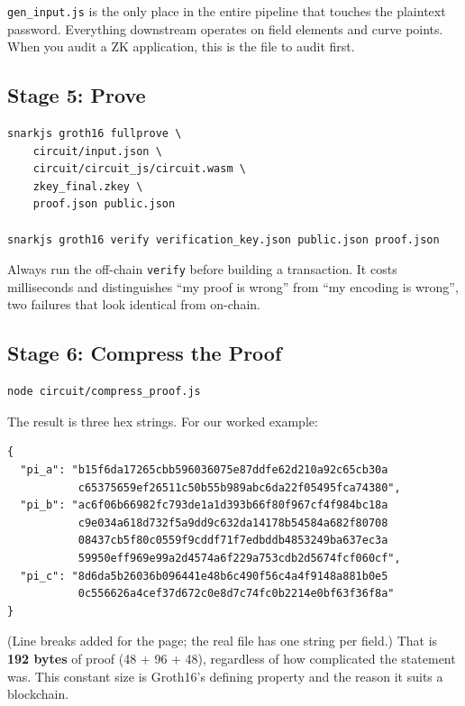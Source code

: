 \begin{remark}
\texttt{gen\_input.js} is the only place in the entire pipeline that touches the
plaintext password. Everything downstream operates on field elements and curve
points. When you audit a ZK application, this is the file to audit first.
\end{remark}

\subsection*{Stage 5: Prove}

\begin{verbatim}
snarkjs groth16 fullprove \
    circuit/input.json \
    circuit/circuit_js/circuit.wasm \
    zkey_final.zkey \
    proof.json public.json

snarkjs groth16 verify verification_key.json public.json proof.json
\end{verbatim}

Always run the off-chain \texttt{verify} before building a transaction. It costs
milliseconds and distinguishes ``my proof is wrong'' from ``my encoding is
wrong'', two failures that look identical from on-chain.

\subsection*{Stage 6: Compress the Proof}

\begin{verbatim}
node circuit/compress_proof.js
\end{verbatim}

The result is three hex strings. For our worked example:

\begin{verbatim}
{
  "pi_a": "b15f6da17265cbb596036075e87ddfe62d210a92c65cb30a
           c65375659ef26511c50b55b989abc6da22f05495fca74380",
  "pi_b": "ac6f06b66982fc793de1a1d393b66f80f967cf4f984bc18a
           c9e034a618d732f5a9dd9c632da14178b54584a682f80708
           08437cb5f80c0559f9cddf71f7edbddb4853249ba637ec3a
           59950eff969e99a2d4574a6f229a753cdb2d5674fcf060cf",
  "pi_c": "8d6da5b26036b096441e48b6c490f56c4a4f9148a881b0e5
           0c556626a4cef37d672c0e8d7c74fc0b2214e0bf63f36f8a"
}
\end{verbatim}

(Line breaks added for the page; the real file has one string per field.)
That is \textbf{192 bytes} of proof (48 + 96 + 48), regardless of how
complicated the statement was. This constant size is Groth16's defining
property and the reason it suits a blockchain.

